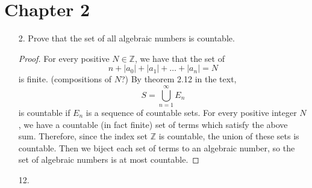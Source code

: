 \documentclass[hidelinks,12pt]{article}
\newcommand{\Z}{\mathbb{Z}}
\begin{document}
\section{Chapter 2}
\begin{enumerate}
    \item[2.] Prove that the set of all algebraic numbers is countable.
        \begin{proof}
            For every positive $N\in\Z$, we have that the set of
            \[
                n+|a_0|+|a_1|+\dots+|a_n|=N
            \]
            is finite. (compositions of $N$?) By theorem 2.12 in the text,
            \[
                S=\bigcup_{n=1}^{\infty}E_n
            \]
            is countable if $E_n$ is a sequence of countable sets. For every positive integer $N$, we have a countable (in fact finite) set of terms which satisfy the above sum. Therefore, since the index set $\Z$ is countable, the union of these sets is countable. Then we biject each set of terms to an algebraic number, so the set of algebraic numbers is at most countable.
        \end{proof}
    \item[12.]
\end{enumerate}
\end{document}
